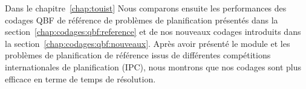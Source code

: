 Dans le chapitre~\ref{chap:touist} 
Nous comparons ensuite les performances des codages QBF de référence de problèmes de planification présentés dans la section~\ref{chap:codages:qbf:reference} et de nos nouveaux codages introduits dans la section~\ref{chap:codages:qbf:nouveaux}. Après avoir présenté le module \touistplan et les problèmes de planification de référence issus de différentes compétitions internationales de planification (IPC), nous montrons que nos codages sont plus efficace en terme de temps de résolution.